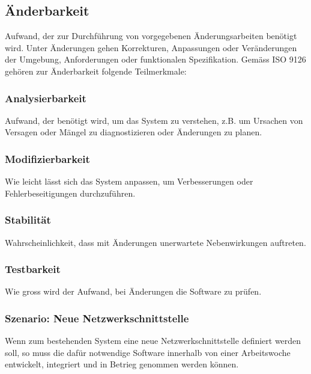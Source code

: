 \documentclass[
	ngerman,
	toc=listof, %
	toc=bibliography, %
	footnotes=multiple, %
	parskip=half, %
	numbers=noendperiod %
]{scrartcl}
\begin{document}
	\subsection{Änderbarkeit}
		Aufwand, der zur Durchführung von vorgegebenen Änderungsarbeiten benötigt wird.
		Unter Änderungen gehen Korrekturen, Anpassungen oder Veränderungen der Umgebung, Anforderungen oder funktionalen Spezifikation.
		Gemäss ISO 9126 gehören zur Änderbarkeit folgende Teilmerkmale:
		
		\subsubsection{Analysierbarkeit}
			Aufwand, der benötigt wird, um das System zu verstehen, z.B. um Ursachen von Versagen oder Mängel zu diagnostizieren oder Änderungen zu planen.

		\subsubsection{Modifizierbarkeit}
			Wie leicht lässt sich das System anpassen, um Verbesserungen oder Fehlerbeseitigungen durchzuführen.

		\subsubsection{Stabilität}
			Wahrscheinlichkeit, dass mit Änderungen unerwartete Nebenwirkungen auftreten.

		\subsubsection{Testbarkeit}
			Wie gross wird der Aufwand, bei Änderungen die Software zu prüfen.

		\newpage

		\subsubsection{Szenario: Neue Netzwerkschnittstelle}
			Wenn zum bestehenden System eine neue Netzwerkschnittstelle definiert werden soll, so muss die dafür notwendige Software innerhalb von einer Arbeitswoche entwickelt, integriert und in Betrieg genommen werden können.
			
\end{document}
